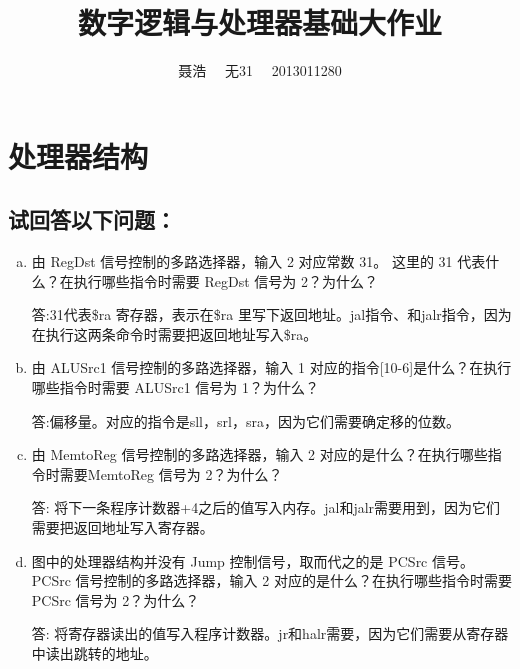 \documentclass{ctexart}
\title{数字逻辑与处理器基础大作业}
\author{聂浩~~ 无31~~ 2013011280}
\begin{document}
\maketitle
\section{处理器结构}
    \subsection{试回答以下问题：}
    \begin {enumerate}[a)]
             \item{由 RegDst 信号控制的多路选择器，输入 2 对应常数 31。 这里的 31 代表什么？在执行哪些指令时需要 RegDst 信号为 2？为什么？}
            
            答:31代表\$ra 寄存器，表示在\$ra 里写下返回地址。jal指令、和jalr指令，因为在执行这两条命令时需要把返回地址写入\$ra。
            
            \item{由 ALUSrc1 信号控制的多路选择器，输入 1 对应的指令[10-6]是什么？在执行哪些指令时需要 ALUSrc1 信号为 1？为什么？}
    
            答:偏移量。对应的指令是sll，srl，sra，因为它们需要确定移的位数。
            \item{由 MemtoReg 信号控制的多路选择器，输入 2 对应的是什么？在执行哪些指令时需要MemtoReg 信号为 2？为什么？}
    
               答: 将下一条程序计数器+4之后的值写入内存。jal和jalr需要用到，因为它们需要把返回地址写入寄存器。
    
            \item{图中的处理器结构并没有 Jump 控制信号，取而代之的是 PCSrc 信号。 PCSrc 信号控制的多路选择器，输入 2 对应的是什么？在执行哪些指令时需要 PCSrc 信号为 2？为什么？}
    
               答: 将寄存器读出的值写入程序计数器。jr和halr需要，因为它们需要从寄存器中读出跳转的地址。
    

\end{enumerate}
\end{document}
